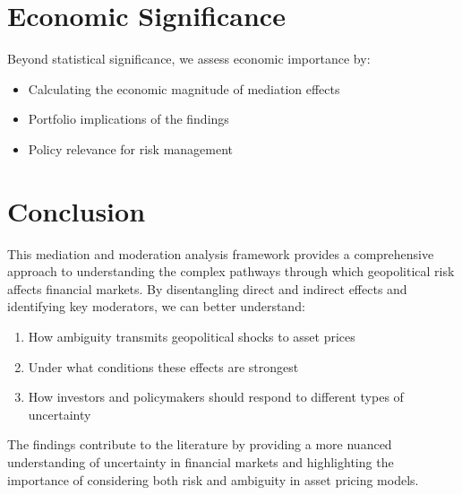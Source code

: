 \documentclass{article}
\begin{document}
\section{Economic Significance}

Beyond statistical significance, we assess economic importance by:
\begin{itemize}
\item Calculating the economic magnitude of mediation effects
\item Portfolio implications of the findings
\item Policy relevance for risk management
\end{itemize}

\section{Conclusion}

This mediation and moderation analysis framework provides a comprehensive approach to understanding the complex pathways through which geopolitical risk affects financial markets. By disentangling direct and indirect effects and identifying key moderators, we can better understand:
\begin{enumerate}
\item How ambiguity transmits geopolitical shocks to asset prices
\item Under what conditions these effects are strongest
\item How investors and policymakers should respond to different types of uncertainty
\end{enumerate}

The findings contribute to the literature by providing a more nuanced understanding of uncertainty in financial markets and highlighting the importance of considering both risk and ambiguity in asset pricing models.



\end{document}
